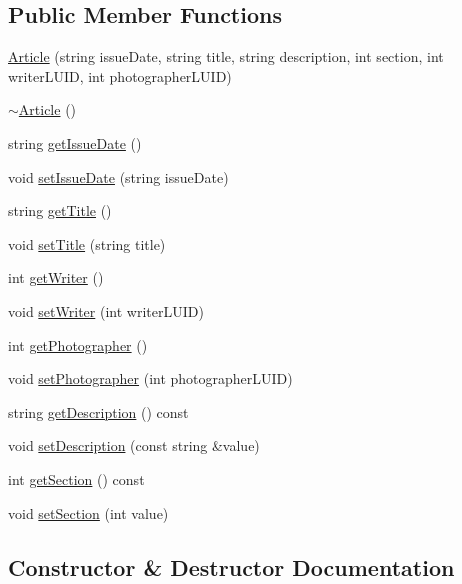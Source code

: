 \subsection*{Public Member Functions}
\begin{DoxyCompactItemize}
\item 
\hyperlink{class_article_a941ff639b4dd29e5f234e1d4d3126bde}{Article} (string issue\+Date, string title, string description, int section, int writer\+L\+U\+I\+D, int photographer\+L\+U\+I\+D)
\item 
\hyperlink{class_article_a5c429e49b30104b1069044d0e1a6aa1a}{$\sim$\+Article} ()
\item 
string \hyperlink{class_article_aa7de0296d6ba592e9550e09aea1dc3bc}{get\+Issue\+Date} ()
\item 
void \hyperlink{class_article_a9431e8b1be3a0c4da46dbfde12e0a06c}{set\+Issue\+Date} (string issue\+Date)
\item 
string \hyperlink{class_article_a6fca8ef24a200337b22cc52f2e00660d}{get\+Title} ()
\item 
void \hyperlink{class_article_a4bd106e7f692f28788cabee1e90d6269}{set\+Title} (string title)
\item 
int \hyperlink{class_article_aa2695bf4770a05db7b914828962ef2d7}{get\+Writer} ()
\item 
void \hyperlink{class_article_a26127a321d0a93bd419ee612d78afb48}{set\+Writer} (int writer\+L\+U\+I\+D)
\item 
int \hyperlink{class_article_a43b05b03994e0985117aa8e590cc1cb8}{get\+Photographer} ()
\item 
void \hyperlink{class_article_a225e9a31e16c5cabd92a8c09c91c2dd4}{set\+Photographer} (int photographer\+L\+U\+I\+D)
\item 
string \hyperlink{class_article_a0446f2c2f3db66ee9f58a4f16399d7dc}{get\+Description} () const 
\item 
void \hyperlink{class_article_a210105de916d864e8535b881302f6a52}{set\+Description} (const string \&value)
\item 
int \hyperlink{class_article_a6bdb98f93b921392d7258bf63c7c322b}{get\+Section} () const 
\item 
void \hyperlink{class_article_a53d48184ea7f6838904aef039114ba4f}{set\+Section} (int value)
\end{DoxyCompactItemize}


\subsection{Constructor \& Destructor Documentation}
\hypertarget{class_article_a941ff639b4dd29e5f234e1d4d3126bde}{}
